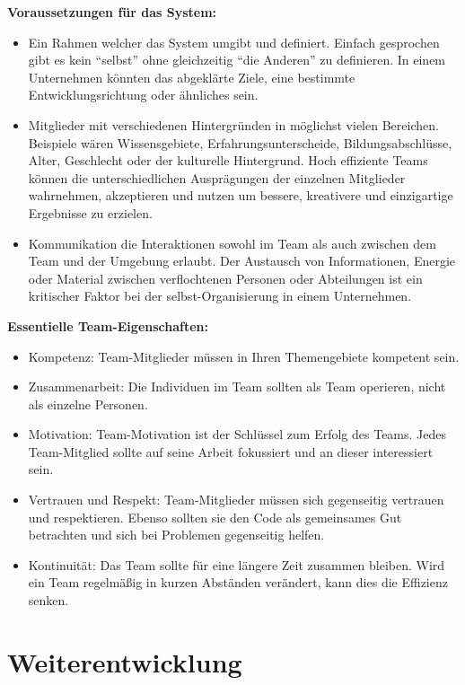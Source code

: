 \textbf{Voraussetzungen für das System:}\cite{Mittal2013}
\begin{itemize}
	\item Ein Rahmen welcher das System umgibt und definiert. Einfach gesprochen gibt es kein "`selbst"' ohne gleichzeitig "`die Anderen"' zu definieren. In einem Unternehmen könnten das abgeklärte Ziele, eine bestimmte Entwicklungsrichtung oder ähnliches sein.
	\item Mitglieder mit verschiedenen Hintergründen in möglichst vielen Bereichen. Beispiele wären Wissensgebiete, Erfahrungsunterscheide, Bildungsabschlüsse, Alter, Geschlecht oder der kulturelle Hintergrund. Hoch effiziente Teams können die unterschiedlichen Ausprägungen der einzelnen Mitglieder wahrnehmen, akzeptieren und nutzen um bessere, kreativere und einzigartige Ergebnisse zu erzielen.
	\item Kommunikation die Interaktionen sowohl im Team als auch zwischen dem Team und der Umgebung erlaubt. Der Austausch von Informationen, Energie oder Material zwischen verflochtenen Personen oder Abteilungen ist ein kritischer Faktor bei der selbst-Organisierung in einem Unternehmen.
\end{itemize}

\textbf{Essentielle Team-Eigenschaften:}\cite{Mittal2013}
\begin{itemize}
	\item Kompetenz: Team-Mitglieder müssen in Ihren Themengebiete kompetent sein.
	\item Zusammenarbeit: Die Individuen im Team sollten als Team operieren, nicht als einzelne Personen.
	\item Motivation: Team-Motivation ist der Schlüssel zum Erfolg des Teams. Jedes Team-Mitglied sollte auf seine Arbeit fokussiert und an dieser interessiert sein.
	\item Vertrauen und Respekt: Team-Mitglieder müssen sich gegenseitig vertrauen und respektieren. Ebenso sollten sie den Code als gemeinsames Gut betrachten und sich bei Problemen gegenseitig helfen.
	\item Kontinuität: Das Team sollte für eine längere Zeit zusammen bleiben. Wird ein Team regelmäßig in kurzen Abständen verändert, kann dies die Effizienz senken. 
\end{itemize}

\section{Weiterentwicklung}

